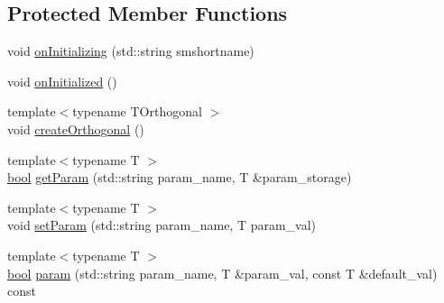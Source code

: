 \subsection*{Protected Member Functions}
\begin{DoxyCompactItemize}
\item 
void \hyperlink{classsmacc_1_1ISmaccStateMachine_ae8c9c79ca6cd77c975f5d9cda33a6d5e}{on\+Initializing} (std\+::string smshortname)
\item 
void \hyperlink{classsmacc_1_1ISmaccStateMachine_a95e7f71d0d88fffd0afebb1f9ccdade5}{on\+Initialized} ()
\item 
{\footnotesize template$<$typename T\+Orthogonal $>$ }\\void \hyperlink{classsmacc_1_1ISmaccStateMachine_a9155cf3d1877255d70b0bd71648734a3}{create\+Orthogonal} ()
\item 
{\footnotesize template$<$typename T $>$ }\\\hyperlink{classbool}{bool} \hyperlink{classsmacc_1_1ISmaccStateMachine_ac9fda4abe36f62db5ae231289afa4665}{get\+Param} (std\+::string param\+\_\+name, T \&param\+\_\+storage)
\item 
{\footnotesize template$<$typename T $>$ }\\void \hyperlink{classsmacc_1_1ISmaccStateMachine_afc730437f45fa107292c078dfab2aa37}{set\+Param} (std\+::string param\+\_\+name, T param\+\_\+val)
\item 
{\footnotesize template$<$typename T $>$ }\\\hyperlink{classbool}{bool} \hyperlink{classsmacc_1_1ISmaccStateMachine_a5c8c2c09423e321a46567a671d18d8e4}{param} (std\+::string param\+\_\+name, T \&param\+\_\+val, const T \&default\+\_\+val) const 
\end{DoxyCompactItemize}
